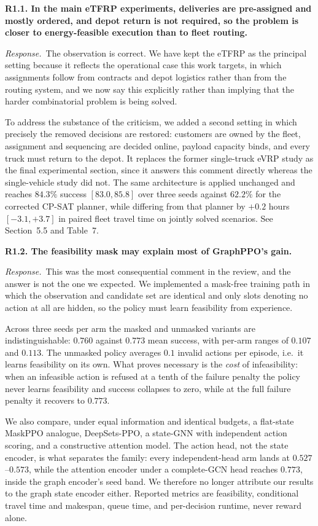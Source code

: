 \documentclass[11pt]{article}
\newcommand{\comment}[1]{\medskip\noindent\textbf{#1}\par\nopagebreak\smallskip}
\newcommand{\reply}{\noindent\textit{Response.}\ }
\begin{document}
\comment{R1.1. In the main eTFRP experiments, deliveries are pre-assigned and
mostly ordered, and depot return is not required, so the problem is closer to
energy-feasible execution than to fleet routing.}
\reply The observation is correct. We have kept the eTFRP as the principal
setting because it reflects the operational case this work targets, in which
assignments follow from contracts and depot logistics rather than from the
routing system, and we now say this explicitly rather than implying that the
harder combinatorial problem is being solved.

To address the substance of the criticism, we added a second setting in which
precisely the removed decisions are restored: customers are owned by the fleet,
assignment and sequencing are decided online, payload capacity binds, and every
truck must return to the depot. It replaces the former single-truck eVRP study
as the final experimental section, since it answers this comment directly
whereas the single-vehicle study did not. The same architecture is applied
unchanged and reaches $84.3\%$ success $[83.0, 85.8]$ over three seeds against
$62.2\%$ for the corrected CP-SAT planner, while differing from that planner by
$+0.2$ hours $[-3.1, +3.7]$ in paired fleet travel time on jointly solved
scenarios. See Section~5.5 and Table~7.

\comment{R1.2. The feasibility mask may explain most of GraphPPO's gain.}
\reply This was the most consequential comment in the review, and the answer is
not the one we expected. We implemented a mask-free training path in which the
observation and candidate set are identical and only slots denoting no action at
all are hidden, so the policy must learn feasibility from experience.

Across three seeds per arm the masked and unmasked variants are
indistinguishable: $0.760$ against $0.773$ mean success, with per-arm ranges of
$0.107$ and $0.113$. The unmasked policy averages $0.1$ invalid actions per
episode, i.e.\ it learns feasibility on its own. What proves necessary is the
\emph{cost} of infeasibility: when an infeasible action is refused at a tenth of
the failure penalty the policy never learns feasibility and success collapses to
zero, while at the full failure penalty it recovers to $0.773$.

We also compare, under equal information and identical budgets, a flat-state
MaskPPO analogue, DeepSets-PPO, a state-GNN with independent action scoring, and
a constructive attention model. The action head, not the state encoder, is what
separates the family: every independent-head arm lands at $0.527$--$0.573$,
while the attention encoder under a complete-GCN head reaches $0.773$, inside
the graph encoder's seed band. We therefore no longer attribute our results to
the graph state encoder either. Reported metrics are feasibility, conditional
travel time and makespan, queue time, and per-decision runtime, never reward
alone.
\end{document}
